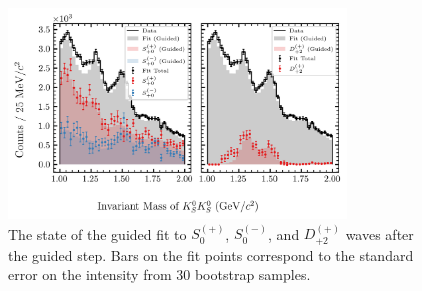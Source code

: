 \begin{figure}
  \begin{center}
    \includegraphics[width=0.8\textwidth]{figures/guided_fit_chisqdof_3.4_splot_D_1s_2b_phase_factor_waves29099_uncertainty_bootstrap-SE.png}
  \end{center}
  \caption{The state of the guided fit to $S_{0}^{(+)}$, $S_{0}^{(-)}$, and $D_{+2}^{(+)}$ waves after the guided step. Bars on the fit points correspond to the standard error on the intensity from $ 30 $ bootstrap samples.}\label{fig:guided-fit-chisqdof-3.4-Spn-D2p}
\end{figure}

